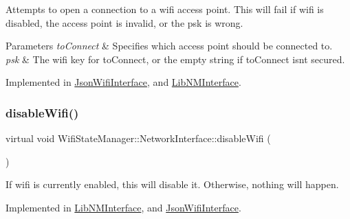 Attempts to open a connection to a wifi access point. This will fail if wifi is disabled, the access point is invalid, or the psk is wrong.


\begin{DoxyParams}{Parameters}
{\em to\+Connect} & Specifies which access point should be connected to.\\
\hline
{\em psk} & The wifi key for to\+Connect, or the empty string if to\+Connect isn\textquotesingle{}t secured. \\
\hline
\end{DoxyParams}


Implemented in \mbox{\hyperlink{classJsonWifiInterface_aed57685bddc0a447976d86095d232cf5}{Json\+Wifi\+Interface}}, and \mbox{\hyperlink{classLibNMInterface_ac0e06cb2f360cd1cb16b50d4feff92c7}{Lib\+N\+M\+Interface}}.

\mbox{\label{classWifiStateManager_1_1NetworkInterface_ab0dc19a7f15294a59894581a34d6109e}} 
\subsubsection{\texorpdfstring{disable\+Wifi()}{disableWifi()}}
{\footnotesize\ttfamily virtual void Wifi\+State\+Manager\+::\+Network\+Interface\+::disable\+Wifi (\begin{DoxyParamCaption}{ }\end{DoxyParamCaption})\hspace{0.3cm}{\ttfamily [pure virtual]}}

If wifi is currently enabled, this will disable it. Otherwise, nothing will happen. 

Implemented in \mbox{\hyperlink{classLibNMInterface_a49b4c61f6f8794d6af742464ab0f2d93}{Lib\+N\+M\+Interface}}, and \mbox{\hyperlink{classJsonWifiInterface_a076d1c4d0830aad955a77c4ff46a15f7}{Json\+Wifi\+Interface}}.

\mbox{\label{classWifiStateManager_1_1NetworkInterface_a440fe19155e268f94cbbd4e133b95037}} 
